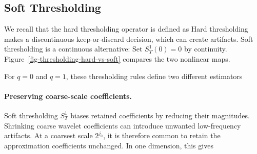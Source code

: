                                                                                                                                              

                                                     
\subsection{Soft Thresholding}

We recall that the hard thresholding operator is defined as
Hard thresholding makes a discontinuous keep-or-discard decision, which can create artifacts. Soft thresholding is a continuous alternative:
Set $S_T^1(0)=0$ by continuity. Figure~\ref{fig-thresholding-hard-vs-soft} compares the two nonlinear maps.


For $q=0$ and $q=1$, these thresholding rules define two different estimators



  
\paragraph{Preserving coarse-scale coefficients.}

Soft thresholding $S_T^1$ biases retained coefficients by reducing their magnitudes.
Shrinking coarse wavelet coefficients can introduce unwanted low-frequency artifacts. At a coarsest scale $2^{j_0}$, it is therefore common to retain the approximation coefficients unchanged. In one dimension, this gives
                                                                                                 

